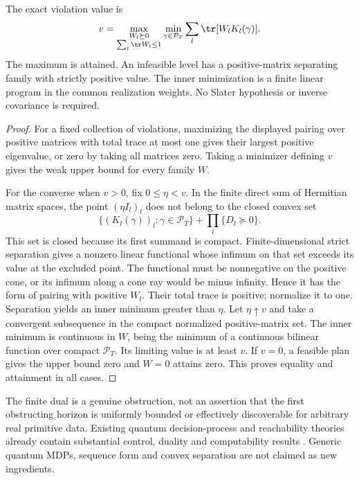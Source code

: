 \begin{theorem}\label{thm:synthesis-dual}
The exact violation value is
\begin{equation}\label{eq:synthesis-dual}
 v=\max_{\substack{W_l\succeq0\\\sum_l\tr W_l\le1}}
       \min_{\gamma\in\mathcal P_T}\sum_l\tr[W_lK_l(\gamma)].
\end{equation}
The maximum is attained. An infeasible level has a positive-matrix separating family with strictly positive value. The inner minimization is a finite linear program in the common realization weights. No Slater hypothesis or inverse covariance is required.
\end{theorem}
\begin{proof}
For a fixed collection of violations, maximizing the displayed pairing over positive matrices with total trace at most one gives their largest positive eigenvalue, or zero by taking all matrices zero. Taking a minimizer defining $v$ gives the weak upper bound for every family $W$.

For the converse when $v>0$, fix $0\le\eta<v$. In the finite direct sum of Hermitian matrix spaces, the point $(\eta I_l)_l$ does not belong to the closed convex set
\[
 \{(K_l(\gamma))_l:\gamma\in\mathcal P_T\}
       +\prod_l\{D_l\succeq0\}.
\]
This set is closed because its first summand is compact. Finite-dimensional strict separation gives a nonzero linear functional whose infimum on that set exceeds its value at the excluded point. The functional must be nonnegative on the positive cone, or its infimum along a cone ray would be minus infinity. Hence it has the form of pairing with positive $W_l$. Their total trace is positive; normalize it to one. Separation yields an inner minimum greater than $\eta$. Let $\eta\uparrow v$ and take a convergent subsequence in the compact normalized positive-matrix set. The inner minimum is continuous in $W$, being the minimum of a continuous bilinear function over compact $\mathcal P_T$. Its limiting value is at least $v$. If $v=0$, a feasible plan gives the upper bound zero and $W=0$ attains zero. This proves equality and attainment in all cases.
\end{proof}

The finite dual is a genuine obstruction, not an assertion that the first obstructing horizon is uniformly bounded or effectively discoverable for arbitrary real primitive data. Existing quantum decision-process and reachability theories already contain substantial control, duality and computability results \cite{Barry14,Ying18,Saldi25}. Generic quantum MDPs, sequence form and convex separation are not claimed as new ingredients.

